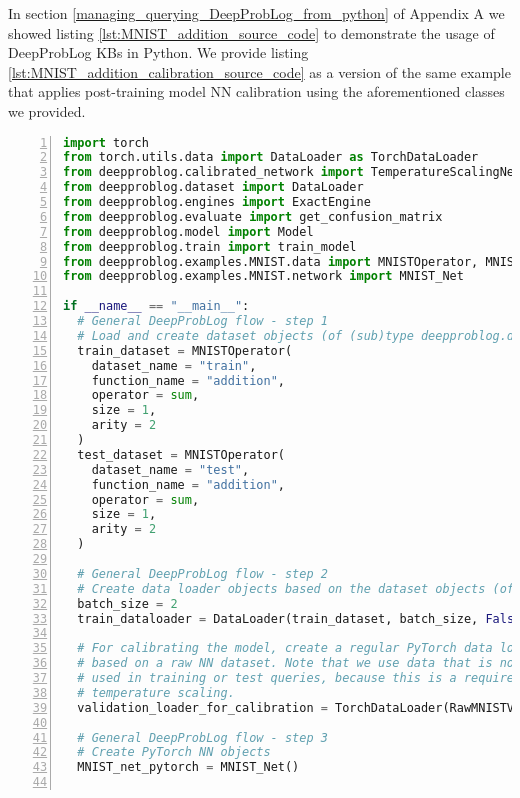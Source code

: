 In section \ref{managing_querying_DeepProbLog_from_python} of Appendix A we showed listing \ref{lst:MNIST_addition_source_code} to demonstrate the usage of DeepProbLog KBs in Python. We provide listing \ref{lst:MNIST_addition_calibration_source_code} as a version of the same example that applies post-training model NN calibration using the aforementioned classes we provided.
\begin{lstlisting}[language=Python, caption={src/deepproblog/examples/MNIST/basic\_addition\_calibration.py, the post training calibrated basic MNIST single-digit addition example}, numbers=left, label={lst:MNIST_addition_calibration_source_code}, captionpos=b]
import torch
from torch.utils.data import DataLoader as TorchDataLoader
from deepproblog.calibrated_network import TemperatureScalingNetwork, NetworkECECollector
from deepproblog.dataset import DataLoader
from deepproblog.engines import ExactEngine
from deepproblog.evaluate import get_confusion_matrix
from deepproblog.model import Model
from deepproblog.train import train_model
from deepproblog.examples.MNIST.data import MNISTOperator, MNIST_train, MNIST_test, RawMNISTValidationDataset
from deepproblog.examples.MNIST.network import MNIST_Net

if __name__ == "__main__":
  # General DeepProbLog flow - step 1
  # Load and create dataset objects (of (sub)type deepproblog.dataset.Dataset)
  train_dataset = MNISTOperator(
    dataset_name = "train",
    function_name = "addition",
    operator = sum,
    size = 1,
    arity = 2
  )
  test_dataset = MNISTOperator(
    dataset_name = "test",
    function_name = "addition",
    operator = sum,
    size = 1,
    arity = 2
  )

  # General DeepProbLog flow - step 2
  # Create data loader objects based on the dataset objects (of (sub)type deepproblog.dataset.DataLoader)
  batch_size = 2
  train_dataloader = DataLoader(train_dataset, batch_size, False)

  # For calibrating the model, create a regular PyTorch data loader
  # based on a raw NN dataset. Note that we use data that is no longer
  # used in training or test queries, because this is a requirement of
  # temperature scaling.
  validation_loader_for_calibration = TorchDataLoader(RawMNISTValidationDataset(), batch_size)

  # General DeepProbLog flow - step 3
  # Create PyTorch NN objects
  MNIST_net_pytorch = MNIST_Net()


\end{lstlisting}
